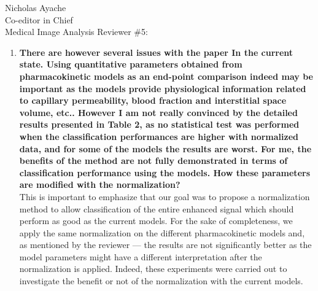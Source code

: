 \documentclass{letter}
\begin{document}
\begin{letter}{Nicholas Ayache \\ Co-editor in Chief \\ Medical Image Analysis}
  Reviewer \#5:
  \begin{enumerate}
  \item \textbf{There are however several issues with the paper In the
      current state. Using quantitative parameters obtained from
      pharmacokinetic models as an end-point comparison indeed may be
      important as the models provide physiological information
      related to capillary permeability, blood fraction and
      interstitial space volume, etc.. However I am not really
      convinced by the detailed results presented in Table 2, as no
      statistical test was performed when the classification
      performances are higher with normalized data, and for some of
      the models the results are worst. For me, the benefits of the
      method are not fully demonstrated in terms of classification
      performance using the models. How these parameters are modified
      with the normalization?}\\
    This is important to emphasize that our goal was to propose a
    normalization method to allow classification of the entire
    enhanced signal which should perform as good as the current
    models. For the sake of completeness, we apply the same
    normalization on the different
    pharmacokinetic models and, as mentioned by the reviewer ---
    the results are not significantly better as the model parameters
    might have a different interpretation after the normalization is
    applied.
    Indeed, these experiments were carried out to investigate the
    benefit or not of the normalization with the current models.

\end{enumerate}
\end{letter}
\end{document}
